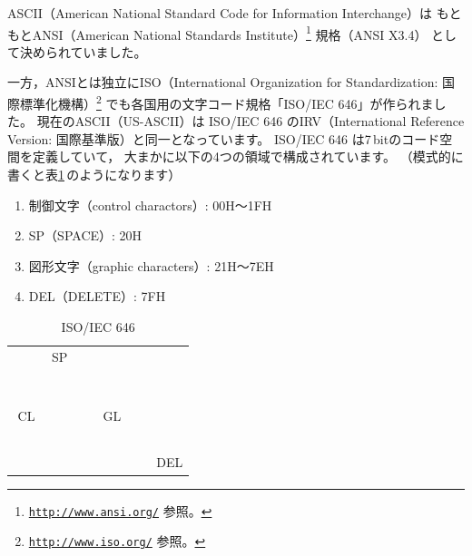 \documentclass[a4j,10pt,fleqn]{jsarticle}
\begin{document}
ASCII（American National Standard Code for Information Interchange）は
もともとANSI（American National Standards Institute）\footnote{
    \href{http://www.ansi.org/}{\texttt{http://www.ansi.org/}} 参照。
} 規格（ANSI X3.4）
として決められていました。

一方，ANSIとは独立にISO（International Organization for Standardization: 国際標準化機構）\footnote{
    \href{http://www.iso.org/}{\texttt{http://www.iso.org/}} 参照。
} でも各国用の文字コード規格「ISO/IEC 646」が作られました。
現在のASCII（US-ASCII）は ISO/IEC 646 のIRV（International Reference Version: 国際基準版）と同一となっています。
ISO/IEC 646 は7\,bitのコード空間を定義していて，
大まかに以下の4つの領域で構成されています。
（模式的に書くと表\ref{tbl:ISO646}\,のようになります）

\begin{enumerate}
\item 制御文字（control charactors）: 00H～1FH
\item SP（SPACE）: 20H
\item 図形文字（graphic characters）: 21H～7EH
\item DEL（DELETE）: 7FH
\end{enumerate}

\begin{table}[htp]
\begin{center}\begin{tabular}{|cc|cccccc|}
    \hline
       &   & \multicolumn{1}{c|}{\footnotesize{SP}} &   &   &   &   &   \\ \cline{3-3}
     ~ & ~ & ~ & ~ & ~ & ~ & ~ & ~ \\
       &   &   &   &   &   &   &   \\
       &   &   &   &   &   &   &   \\
       &   &   &   &   &   &   &   \\
    \multicolumn{2}{|c|}{\footnotesize{CL}} &   &   & \multicolumn{2}{c}{\footnotesize{GL}} &   &   \\
       &   &   &   &   &   &   &   \\
       &   &   &   &   &   &   &   \\
       &   &   &   &   &   &   &   \\
       &   &   &   &   &   &   &   \\
       &   &   &   &   &   &   &   \\  \cline{8-8}
       &   &   &   &   &   &   & \multicolumn{1}{|c|}{\footnotesize{DEL}} \\
    \hline
\end{tabular}\end{center}
\caption{ISO/IEC 646} \label{tbl:ISO646}
\end{table}
\end{document}
